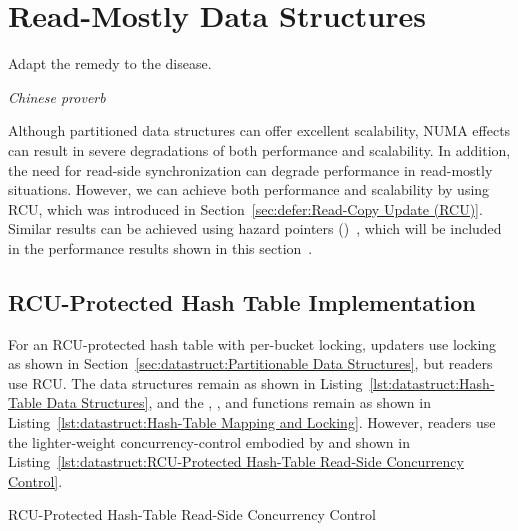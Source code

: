 \section{Read-Mostly Data Structures}
\label{sec:datastruct:Read-Mostly Data Structures}
%
\epigraph{Adapt the remedy to the disease.}{\emph{Chinese proverb}}

Although partitioned data structures can offer excellent scalability,
NUMA effects can result in severe degradations of both performance and
scalability.
In addition,
the need for read-side synchronization can degrade performance in
read-mostly situations.
However, we can achieve both performance and scalability by using
RCU, which was introduced in
Section~\ref{sec:defer:Read-Copy Update (RCU)}.
Similar results can be achieved using hazard pointers
()~\cite{MagedMichael04a}, which will be included in
the performance results shown in this
section~\cite{McKenney:2013:SDS:2483852.2483867}.

\subsection{RCU-Protected Hash Table Implementation}
\label{sec:datastruct:RCU-Protected Hash Table Implementation}

For an RCU-protected hash table with per-bucket locking,
updaters use locking as shown in
Section~\ref{sec:datastruct:Partitionable Data Structures},
but readers use RCU\@.
The data structures remain as shown in
Listing~\ref{lst:datastruct:Hash-Table Data Structures},
and the , , and 
functions remain as shown in
Listing~\ref{lst:datastruct:Hash-Table Mapping and Locking}.
However, readers use the lighter-weight concurrency-control embodied
by  and 
shown in
Listing~\ref{lst:datastruct:RCU-Protected Hash-Table Read-Side Concurrency Control}.

\begin{listing}[tb]

\caption{RCU-Protected Hash-Table Read-Side Concurrency Control}
\label{lst:datastruct:RCU-Protected Hash-Table Read-Side Concurrency Control}
\end{listing}

